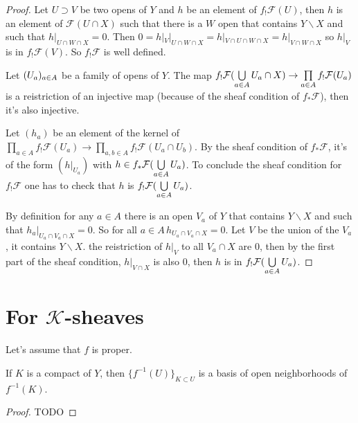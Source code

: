 \begin{proof}
    Let $U\supset V$ be two opens of $Y$ and $h$ be an element of $f_!\mathcal{F}(U)$, then $h$ is an element of $\mathcal{F}(U\cap X)$ such that there is a $W$ open that contains $Y\backslash X$ and such that $h|_{U\cap W\cap X}=0$. Then  $0=h|_V|_{U\cap W\cap X}=h|_{V\cap U\cap W\cap X}=h|_{V\cap W\cap X}$ so $h|_V$ is in $f_!\mathcal{F}(V)$. So $f_!\mathcal{F}$ is well defined.

    Let $(U_a)_{a\in A}$ be a family of opens of $Y$. The map $f_!\mathcal{F}(\bigcup\limits_{a\in A}U_a\cap X)\to\prod\limits_{a\in A}f_!\mathcal{F}(U_a)$ is a reistriction of an injective map (because of the sheaf condition of $f_*\mathcal{F}$), then it's also injective.

    Let $(h_a)$ be an element of the kernel of $\prod\limits_{a\in A}f_!\mathcal{F}(U_a)\to \prod\limits_{a,b\in A}f_!\mathcal{F}(U_a\cap U_b)$. By the sheaf condition of $f_*\mathcal{F}$, it's of the form $(h|_{U_a})$ with $h\in f_*\mathcal{F}(\bigcup\limits_{a\in A}U_a)$. To conclude the sheaf condition for $f_!\mathcal{F}$ one has to check that $h$ is $f_!\mathcal{F}(\bigcup\limits_{a\in A}U_a)$.

    By definition for any $a\in A$ there is an open $V_a$ of $Y$ that contains $Y\backslash X$ and such that $h_a|_{U_a\cap V_a\cap X}=0$. So for all $a\in A\, h_{U_a\cap V_a\cap X}=0$. Let $V$ be the union of the $V_a$, it contains $Y\backslash X$. the reistriction of $h|_V$ to all $V_a\cap X$ are $0$, then by the first part of the sheaf condition, $h|_{V\cap X}$ is also $0$, then $h$ is in $f_!\mathcal{F}(\bigcup\limits_{a\in A}U_a)$.    
    
\end{proof}

\section{For $\mathcal{K}$-sheaves}

Let's assume that $f$ is proper.

\begin{lemma}\label{lem:basis_of_open_of_fm1K}
    If $K$ is a compact of $Y$, then $\{f^{-1}(U)\}_{K\subset U}$ is a basis of open neighborhoods of $f^{-1}(K)$.
\end{lemma}

\begin{proof}
    TODO
\end{proof}

